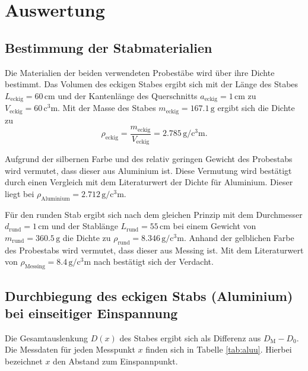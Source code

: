 \section{Auswertung}
\label{sec:Auswertung}
\subsection{Bestimmung der Stabmaterialien}
Die Materialien der beiden verwendeten Probestäbe wird über ihre Dichte bestimmt.
Das Volumen des eckigen Stabes ergibt sich mit der Länge des Stabes $L_{\mathrm{eckig}}=60\,\si{\centi\meter}$
und der Kantenlänge des Querschnitts $a_{\mathrm{eckig}}=1\,\si{\centi\meter}$ zu $V_{\mathrm{eckig}}=60\,\si{\cubic\centi\meter}$.
Mit der Masse des Stabes $m_{\mathrm{eckig}}=167.1\,\si{\gram}$ ergibt sich die Dichte zu
\begin{equation}
	\rho_{\mathrm{eckig}}=\frac{m_{\mathrm{eckig}}}{V_{\mathrm{eckig}}}=2.785 \,\si{\gram\per\cubic\centi\meter}\text{.}
\end{equation}

Aufgrund der silbernen Farbe und des relativ geringen Gewicht des Probestabs wird vermutet, dass dieser aus Aluminium ist.
Diese Vermutung wird bestätigt durch einen Vergleich mit dem Literaturwert der Dichte für Aluminium.
Dieser liegt bei $\rho_{\mathrm{Aluminium}}=2.712\,\si{\gram\per\cubic\centi\meter}$.

Für den runden Stab ergibt sich nach dem gleichen Prinzip mit dem Durchmesser $d_{\mathrm{rund}}=1\,\si{\centi\meter}$ und der Stablänge $L_{\mathrm{rund}}=55\,\si{\centi\meter}$ bei einem
Gewicht von $m_{\mathrm{rund}}=360.5\,\si{\gram}$ die Dichte zu $\rho_{\mathrm{rund}}=8.346 \,\si{\gram\per\cubic\centi\meter}$.
Anhand der gelblichen Farbe des Probestabs wird vermutet, dass dieser aus Messing ist.
Mit dem Literaturwert von $\rho_{\mathrm{Messing}}=8.4\,\si{\gram\per\cubic\centi\meter}$ nach \cite{Werkzeugkiste} %
bestätigt sich der Verdacht.

\FloatBarrier
\subsection{Durchbiegung des eckigen Stabs (Aluminium) bei einseitiger Einspannung}
Die Gesamtauslenkung $D(x)$ des Stabes ergibt sich als Differenz aus $D_{\mathrm{M}}-D_{\mathrm{0}}$.
Die Messdaten für jeden Messpunkt $x$ finden sich in Tabelle \ref{tab:aluu}. Hierbei bezeichnet $x$ den Abstand zum Einspannpunkt.

